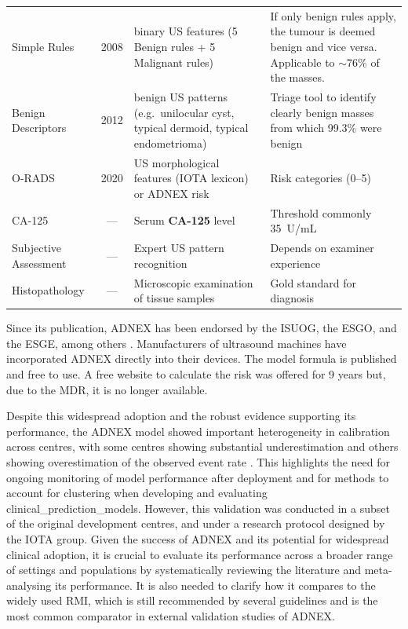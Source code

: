 \begin{table}[t]
\begin{tabularx}{\textwidth}{@{} l c >{\raggedright\arraybackslash}X >{\raggedright\arraybackslash}X @{}}
\addlinespace
Simple Rules \cite{timmermanSimpleUltrasoundbasedRules2008} & 2008 & 10 binary US features (5 Benign rules + 5 Malignant rules) & If only benign rules apply, the tumour is deemed benign and vice versa. Applicable to $\sim$76\% of the masses.  \\
\addlinespace
Benign Descriptors \cite{ameyeClinicallyOrientedThreeStep2012} & 2012 & 4 benign US patterns (e.g.\ unilocular cyst, typical dermoid, typical endometrioma) & Triage tool to identify clearly benign masses from which 99.3\% were benign \\
\addlinespace
O-RADS \cite{andreottiORADSUSRisk2020} & 2020 & US morphological features (IOTA lexicon) or ADNEX risk & Risk categories (0--5)\\
\addlinespace
CA-125 & --- & Serum \textbf{CA-125} level & Threshold commonly 35~U/mL \\
\addlinespace
Subjective Assessment & --- & Expert US pattern recognition & Depends on examiner experience \\
Histopathology & --- & Microscopic examination of tissue samples & Gold standard for diagnosis \\
\bottomrule
\end{tabularx}
\end{table}

Since its publication, \gls{ADNEX} has been endorsed by the \gls{ISUOG}, the \gls{ESGO}, and the \gls{ESGE}, among others \cite{timmermanESGOISUOGIOTA2021}. Manufacturers of ultrasound machines have incorporated \gls{ADNEX} directly into their devices. The model formula is published and free to use. A free website to calculate the risk was offered for 9 years but, due to the \gls{MDR}, it is no longer available. 

Despite this widespread adoption and the robust evidence supporting its performance, the ADNEX model showed important \gls{heterogeneity} in \gls{calibration} across centres, with some centres showing substantial underestimation and others showing overestimation of the observed event rate \cite{vancalsterValidationModelsDiagnose2020}. This highlights the need for ongoing monitoring of model performance after deployment and for methods to account for clustering when developing and evaluating \glspl{clinical_prediction_model}. However, this validation was conducted in a subset of the original development centres, and under a research protocol designed by the IOTA group. Given the success of \gls{ADNEX} and its potential for widespread clinical adoption, it is crucial to evaluate its performance across a broader range of settings and populations by systematically reviewing the literature and meta-analysing its performance. It is also needed to clarify how it compares to the widely used RMI, which is still recommended by several guidelines and is the most common comparator in external validation studies of \gls{ADNEX}.

